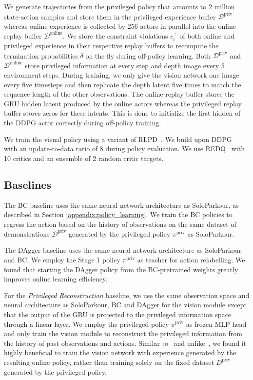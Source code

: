 We generate trajectories from the privileged policy that amounts to 2 million state-action samples and store them in the privileged experience buffer $\mathcal{D}^\text{priv}$ whereas online experience is collected by $256$ actors in parallel into the online replay buffer $\mathcal{D}^\text{online}$.
We store the constraint violations $c_i^+$ of both online and privileged experience in their respective replay buffers to recompute the termination probabilities $\delta$ on the fly during off-policy learning.
Both $\mathcal{D}^\text{priv}$ and  $\mathcal{D}^\text{online}$ store privileged information at every step and depth image every 5 environment steps.
During training, we only give the vision network one image every five timesteps and then replicate the depth latent five times to match the sequence length of the other observations. 
The online replay buffer stores the GRU hidden latent produced by the online actors whereas the privileged replay buffer stores zeros for these latents.
This is done to initialize the first hidden of the DDPG actor correctly during off-policy training.

We train the visual policy using a variant of RLPD~\citep{ball2023efficient}.
We build upon DDPG~\citep{lillicrap2015continuous} with an update-to-data ratio of $8$ during policy evaluation.
We use REDQ~\citep{chen2021randomized} with 10 critics and an ensemble of 2 random critic targets.


\subsection{Baselines}

The BC baseline uses the same neural network architecture as SoloParkour, as described in Section \ref{appendix:policy_learning}.
We train the BC policies to regress the action based on the history of observations on the same dataset of demonstrations $\mathcal{D}^\text{priv}$ generated by the privileged policy $\pi^\text{priv}$ as SoloParkour.

The DAgger baseline uses the same neural network architecture as SoloParkour and BC.
We employ the Stage 1 policy $\pi^\text{priv}$ as teacher for action relabelling.
We found that starting the DAgger policy from the BC-pretrained weights greatly improves online learning efficiency.

For the \textit{Privileged Reconstruction} baseline, we use the same observation space and neural architecture as SoloParkour, BC and DAgger for the vision module except that the output of the GRU is projected to the privileged information space through a linear layer.
We employ the privileged policy $\pi^\text{priv}$ as frozen MLP head and only train the vision module to reconstruct the privileged information from the history of past observations and actions.
Similar to~\citep{agarwal2023legged} and unlike~\citep{duan2023learning}, we found it highly beneficial to train the vision network with experience generated by the resulting online policy, rather than training solely on the fixed dataset $D^\text{priv}$ generated by the privileged policy.


